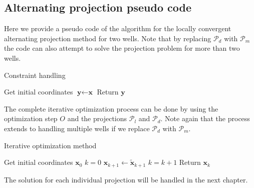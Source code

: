 \subsection{Alternating projection pseudo code}
%
Here we provide a pseudo code of the algorithm for the
locally convergent alternating projection method for two
wells. Note that by replacing $\mathcal{P}_{d}$ with
$\mathcal{P}_{m}$ the code can also attempt to solve 
the projection problem for more than two wells.
%

%
\begin{algorithm}
\caption{Constraint handling}\label{alg:constraint_handling}
\begin{algorithmic}[1]
	\State Get initial coordinates $\textbf{y} \gets \textbf{x}$ 
	\State
	\EndWhile
	\State Return $\textbf{y}$
\EndProcedure
\end{algorithmic}
\end{algorithm}
%
%
The complete iterative optimization process can be done by using
the optimization step $O$ and the projections $\mathcal{P}_{l}$ and
$\mathcal{P}_{d}$. Note again that the process extends to handling
multiple wells if we replace $\mathcal{P}_{d}$ with $\mathcal{P}_{m}$.
%
\begin{algorithm}
\caption{Iterative optimization method}\label{alg:iterative_optimization}
\begin{algorithmic}[1]
	\State Get initial coordinates $\textbf{x}_{0}$
	\State
	\State $ k = 0 $
		\EndWhile
	\State $\textbf{x}_{k+1} \gets \tilde{\textbf{x}}_{k+1}$
	\State $ k = k+1 $
	\EndWhile
	\State Return $\textbf{x}_{k}$
\EndProcedure
\end{algorithmic}
\end{algorithm}
%

The solution for each individual projection will be handled in the next chapter.
